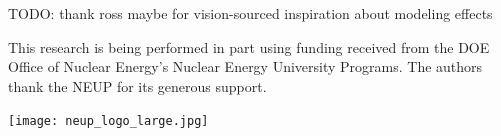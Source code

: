 \documentclass{style}
\begin{document}
TODO: thank ross maybe for vision-sourced inspiration about modeling effects

This research is being performed in part using funding received from the DOE
Office of Nuclear Energy's Nuclear Energy University Programs.  The authors
thank the NEUP for its generous support.

\begin{center}
\texttt{[image: neup\_logo\_large.jpg]}
\end{center}

\pagebreak



\end{document}
